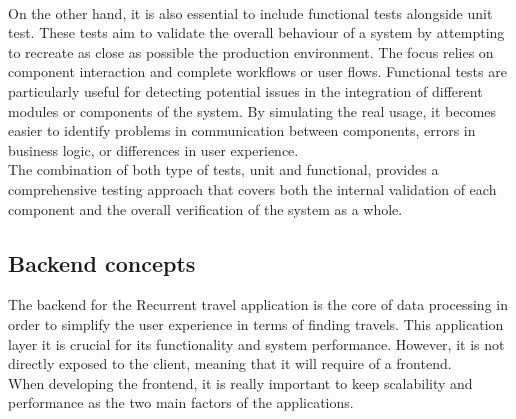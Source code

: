 \documentclass[../memory.tex]{subfiles}
\begin{document}
\\
On the other hand, it is also essential to include functional tests alongside
unit test. These tests aim to validate the overall behaviour of a system by
attempting to recreate as close as possible the production environment. The
focus relies on component interaction and complete workflows or user flows.
Functional tests are particularly useful for detecting potential issues in the
integration of different modules or components of the system. By simulating the
real usage, it becomes easier to identify problems in communication between
components, errors in business logic, or differences in user experience.
\\
The combination of both type of tests, unit and functional, provides a
comprehensive testing approach that covers both the internal validation of each
component and the overall verification of the system as a whole.
\subsection{Backend concepts}
The backend for the Recurrent travel application is the core of data processing
in order to simplify the user experience in terms of finding travels. This
application layer it is crucial for its functionality and system performance.
However, it is not directly exposed to the client, meaning that it will require
of a frontend.
\\
When developing the frontend, it is really important to keep scalability and
performance as the two main factors of the applications.
\end{document}
